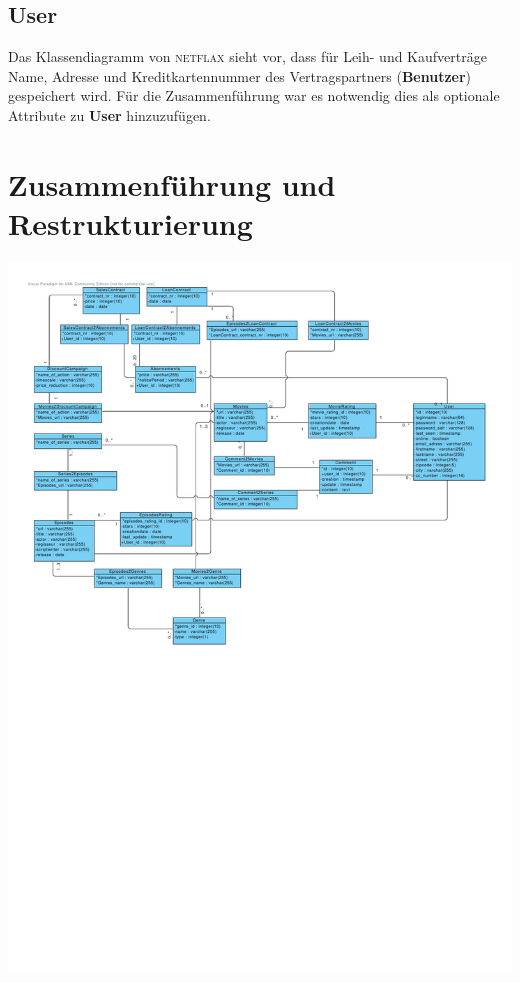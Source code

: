 \documentclass[11pt,a4paper,DIV=9]{scrartcl}
\begin{document}
  \subsection{User}
    Das Klassendiagramm von \textsc{netflax} sieht vor, dass für Leih- und Kaufverträge Name, Adresse und Kreditkartennummer des Vertragspartners (\textbf{Benutzer}) gespeichert wird. Für die Zusammenführung war es notwendig dies als optionale Attribute zu \textbf{User} hinzuzufügen.



\section{Zusammenführung und Restrukturierung}


\includegraphics[page=1, angle=90,trim=0cm 0cm 1.1cm 1cm, clip=true, scale=1.1]{Diagramme/Paket_Netflax}
\end{document}

